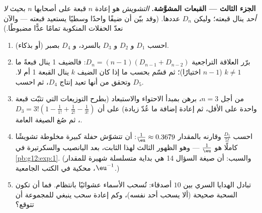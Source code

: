 \begin{problem}
\medskip
\noindent\textbf{الجزء الثالث --- القبعات المشوَّشة.}
\emph{التشويش} هو إعادة  $n$ قبعة على أصحابها
$n$ بحيث \emph{لا أحد} ينال قبعته؛ وليكن
$D_n$ عددها. (وقد بيّن  أن ضيفًا واحدًا
وسطيًا يستعيد قبعته --- والآن نعدّ الحفلات المنكوبة
تمامًا عدًّا مضبوطًا.)
\begin{enumerate}[resume]
  \item احسب $D_1$ و $D_2$ و $D_3$ بالسرد، و $D_4$
        بصبر (أو بذكاء).
  \item برّر العلاقة التراجعية
        $D_n = (n - 1)\left(D_{n-1} + D_{n-2}\right)$: فالضيف 1
        ينال قبعةً ما $k \neq 1$ ($n - 1$ اختيارًا)؛ ثم قسّم
        بحسب ما إذا كان الضيف $k$ ينال القبعة 1 أم لا.
        وتحقق من أنها تعيد إنتاج $D_4$، ثم احسب $D_5$.
  \item من أجل $n = 3$، برهن بمبدأ الاحتواء والاستبعاد (بطرح
        التوزيعات التي تثبّت قبعة واحدة على الأقل، ثم إعادة إضافة
        ما عُدّ زيادة) على أن
        $D_3 = 3!\left(1 - \frac{1}{1!} + \frac{1}{2!} -
        \frac{1}{3!}\right)$، ثم صُغ الصيغة العامة.
  \item احسب $\frac{D_5}{5!}$ وقارنه بالمقدار
        $\frac1\eu \approx 0.3679$:  أن تتشوّش حفلة كبيرة
        مخلوطة تشويشًا كاملًا هو
        $\frac1\eu$ --- وهو الظهور الثالث لهذا الثابت، بعد
        اليانصيب والسكرتيرة في \cref{pb:g12:exp:1}.
        (والسبب: أن صيغة السؤال 14 هي بداية متسلسلة
        شهيرة للمقدار $\eu^{-1}$، محكية في الكتب
        الجامعية.)
  \item تبادل الهدايا السري بين $10$ أصدقاء: تُسحب الأسماء
        عشوائيًا بانتظام. فما  أن تكون السحبة
        صحيحة (ألا يسحب أحد نفسه)، وكم إعادة سحب
        ينبغي للمجموعة أن تتوقع؟
\end{enumerate}


\end{problem}
